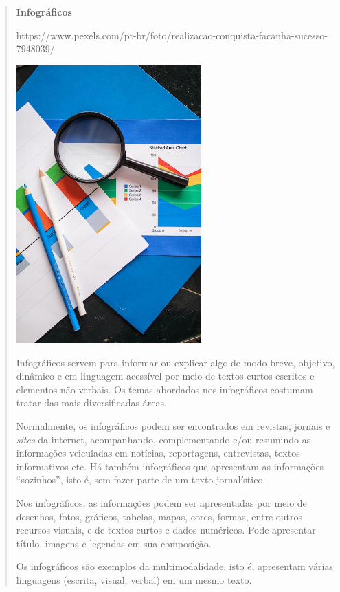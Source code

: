 \begin{itemize}
{{{\begin{itemize}
\begin{itemize}
\begin{itemize}
\begin{quote}
\textbf{Infográficos}

https://www.pexels.com/pt-br/foto/realizacao-conquista-facanha-sucesso-7948039/

\includegraphics[width=2.81075in,height=4.21050in]{media/image29.jpeg}

Infográficos servem para informar ou explicar algo de modo breve,
objetivo, dinâmico e em linguagem acessível por meio de textos curtos
escritos e elementos não verbais. Os temas abordados nos infográficos
costumam tratar das mais diversificadas áreas.

Normalmente, os infográficos podem ser encontrados em revistas, jornais
e \emph{sites} da internet, acompanhando, complementando e/ou resumindo
as informações veiculadas em notícias, reportagens, entrevistas, textos
informativos etc. Há também infográficos que apresentam as informações
``sozinhos'', isto é, sem fazer parte de um texto jornalístico.

Nos infográficos, as informações podem ser apresentadas por meio de
desenhos, fotos, gráficos, tabelas, mapas, cores, formas, entre outros
recursos visuais, e de textos curtos e dados numéricos. Pode apresentar
título, imagens e legendas em sua composição.

Os infográficos são exemplos da multimodalidade, isto é, apresentam
várias linguagens (escrita, visual, verbal) em um mesmo texto.
\end{quote}



\end{itemize}
\end{itemize}
\end{itemize}}}}
\end{itemize}
